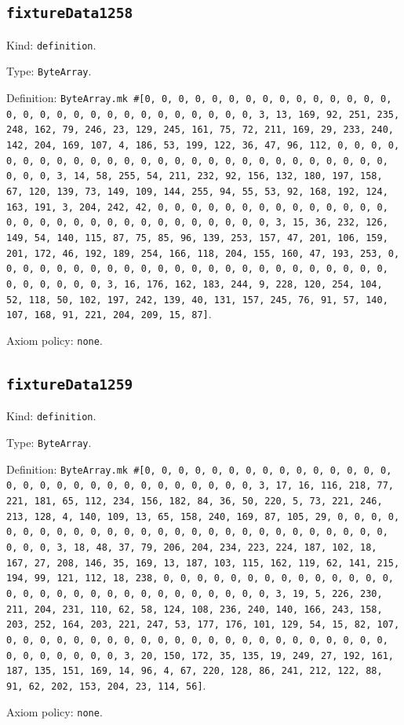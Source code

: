 \documentclass[11pt]{article}
\begin{document}
\subsection*{\texttt{fixtureData1258}}
\noindent Kind: \texttt{definition}.\par
\noindent Type: \texttt{ByteArray}.\par
\noindent Definition: \texttt{ByteArray.mk \#[0, 0, 0, 0, 0, 0, 0, 0, 0, 0, 0, 0, 0, 0, 0, 0, 0, 0, 0, 0, 0, 0, 0, 0, 0, 0, 0, 0, 0, 0, 3, 13, 169, 92, 251, 235, 248, 162, 79, 246, 23, 129, 245, 161, 75, 72, 211, 169, 29, 233, 240, 142, 204, 169, 107, 4, 186, 53, 199, 122, 36, 47, 96, 112, 0, 0, 0, 0, 0, 0, 0, 0, 0, 0, 0, 0, 0, 0, 0, 0, 0, 0, 0, 0, 0, 0, 0, 0, 0, 0, 0, 0, 0, 0, 3, 14, 58, 255, 54, 211, 232, 92, 156, 132, 180, 197, 158, 67, 120, 139, 73, 149, 109, 144, 255, 94, 55, 53, 92, 168, 192, 124, 163, 191, 3, 204, 242, 42, 0, 0, 0, 0, 0, 0, 0, 0, 0, 0, 0, 0, 0, 0, 0, 0, 0, 0, 0, 0, 0, 0, 0, 0, 0, 0, 0, 0, 0, 0, 3, 15, 36, 232, 126, 149, 54, 140, 115, 87, 75, 85, 96, 139, 253, 157, 47, 201, 106, 159, 201, 172, 46, 192, 189, 254, 166, 118, 204, 155, 160, 47, 193, 253, 0, 0, 0, 0, 0, 0, 0, 0, 0, 0, 0, 0, 0, 0, 0, 0, 0, 0, 0, 0, 0, 0, 0, 0, 0, 0, 0, 0, 0, 0, 3, 16, 176, 162, 183, 244, 9, 228, 120, 254, 104, 52, 118, 50, 102, 197, 242, 139, 40, 131, 157, 245, 76, 91, 57, 140, 107, 168, 91, 221, 204, 209, 15, 87]}.\par
\noindent Axiom policy: \texttt{none}.\par
\subsection*{\texttt{fixtureData1259}}
\noindent Kind: \texttt{definition}.\par
\noindent Type: \texttt{ByteArray}.\par
\noindent Definition: \texttt{ByteArray.mk \#[0, 0, 0, 0, 0, 0, 0, 0, 0, 0, 0, 0, 0, 0, 0, 0, 0, 0, 0, 0, 0, 0, 0, 0, 0, 0, 0, 0, 0, 0, 3, 17, 16, 116, 218, 77, 221, 181, 65, 112, 234, 156, 182, 84, 36, 50, 220, 5, 73, 221, 246, 213, 128, 4, 140, 109, 13, 65, 158, 240, 169, 87, 105, 29, 0, 0, 0, 0, 0, 0, 0, 0, 0, 0, 0, 0, 0, 0, 0, 0, 0, 0, 0, 0, 0, 0, 0, 0, 0, 0, 0, 0, 0, 0, 3, 18, 48, 37, 79, 206, 204, 234, 223, 224, 187, 102, 18, 167, 27, 208, 146, 35, 169, 13, 187, 103, 115, 162, 119, 62, 141, 215, 194, 99, 121, 112, 18, 238, 0, 0, 0, 0, 0, 0, 0, 0, 0, 0, 0, 0, 0, 0, 0, 0, 0, 0, 0, 0, 0, 0, 0, 0, 0, 0, 0, 0, 0, 0, 3, 19, 5, 226, 230, 211, 204, 231, 110, 62, 58, 124, 108, 236, 240, 140, 166, 243, 158, 203, 252, 164, 203, 221, 247, 53, 177, 176, 101, 129, 54, 15, 82, 107, 0, 0, 0, 0, 0, 0, 0, 0, 0, 0, 0, 0, 0, 0, 0, 0, 0, 0, 0, 0, 0, 0, 0, 0, 0, 0, 0, 0, 0, 0, 3, 20, 150, 172, 35, 135, 19, 249, 27, 192, 161, 187, 135, 151, 169, 14, 96, 4, 67, 220, 128, 86, 241, 212, 122, 88, 91, 62, 202, 153, 204, 23, 114, 56]}.\par
\noindent Axiom policy: \texttt{none}.\par
\end{document}
